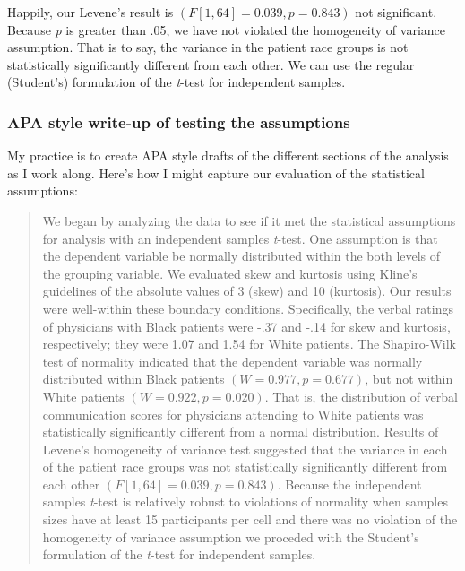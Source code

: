 \documentclass[
  11pt,
]{book}
\begin{document}
Happily, our Levene's result is \((F[1, 64] = 0.039, p = 0.843)\) not significant. Because \emph{p} is greater than .05, we have not violated the homogeneity of variance assumption. That is to say, the variance in the patient race groups is not statistically significantly different from each other. We can use the regular (Student's) formulation of the \emph{t}-test for independent samples.

\hypertarget{apa-style-write-up-of-testing-the-assumptions}{%
\subsubsection{APA style write-up of testing the assumptions}\label{apa-style-write-up-of-testing-the-assumptions}}

My practice is to create APA style drafts of the different sections of the analysis as I work along. Here's how I might capture our evaluation of the statistical assumptions:

\begin{quote}
We began by analyzing the data to see if it met the statistical assumptions for analysis with an independent samples \emph{t}-test. One assumption is that the dependent variable be normally distributed within the both levels of the grouping variable. We evaluated skew and kurtosis using Kline's \citeyearpar{kline_data_2016} guidelines of the absolute values of 3 (skew) and 10 (kurtosis). Our results were well-within these boundary conditions. Specifically, the verbal ratings of physicians with Black patients were -.37 and -.14 for skew and kurtosis, respectively; they were 1.07 and 1.54 for White patients. The Shapiro-Wilk test of normality indicated that the dependent variable was normally distributed within Black patients \((W = 0.977, p = 0.677)\), but not within White patients \((W = 0.922, p = 0.020)\). That is, the distribution of verbal communication scores for physicians attending to White patients was statistically significantly different from a normal distribution. Results of Levene's homogeneity of variance test suggested that the variance in each of the patient race groups was not statistically significantly different from each other \((F[1, 64] = 0.039, p = 0.843)\). Because the independent samples \emph{t}-test is relatively robust to violations of normality when samples sizes have at least 15 participants per cell \citep{green_using_2017} and there was no violation of the homogeneity of variance assumption we proceded with the Student's formulation of the \emph{t}-test for independent samples.
\end{quote}
\end{document}
